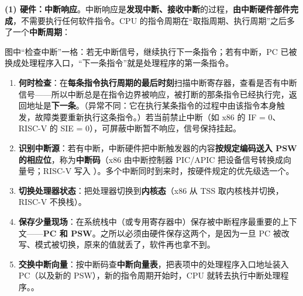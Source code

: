\textbf{(1) 硬件：中断响应}。中断响应是\textbf{发现中断、接收中断}的过程，\textbf{由中断硬件部件完成}，不需要执行任何软件指令。CPU 的指令周期在“取指周期、执行周期”之后多了一个\textbf{中断周期}：\par
\begin{center}
\end{center}
图中“检查中断”一格：若无中断信号，继续执行下一条指令；若有中断，PC 已被换成处理程序入口，“下一条指令”就是处理程序的第一条指令。
\begin{enumerate}
    \item \textbf{何时检查}：在\textbf{每条指令执行周期的最后时刻}扫描中断寄存器，查看是否有中断信号——所以中断总是在指令边界被响应，被打断的那条指令已经执行完，返回地址是\textbf{下一条}。（异常不同：它在执行某条指令的过程中由该指令本身触发，故障类要重新执行这条指令。）若当前禁止中断（如 x86 的 IF = 0、RISC-V 的 SIE = 0），可屏蔽中断暂不响应，信号保持挂起。
    \item \textbf{识别中断源}：若有中断，中断硬件把中断触发器的内容\textbf{按规定编码送入 PSW 的相应位}，称为\textbf{中断码}（x86 由中断控制器 PIC/APIC 把设备信号转换成向量号；RISC-V 写入 ）。多个中断同时到来时，按硬件规定的优先级选一个。
    \item \textbf{切换处理器状态}：把处理器切换到\textbf{内核态}（x86 从 TSS 取内核栈并切换，RISC-V 不换栈）。
    \item \textbf{保存少量现场}：在系统栈中（或专用寄存器中）保存被中断程序最重要的上下文——\textbf{PC 和 PSW}。之所以必须由硬件保存这两个，是因为一旦 PC 被改写、模式被切换，原来的值就丢了，软件再也拿不到。
    \item \textbf{交换中断向量}：按中断码查\textbf{中断向量表}，把表项中的处理程序入口地址装入 PC（以及新的 PSW），新的指令周期开始时，CPU 就转去执行中断处理程序。。
\end{enumerate}

